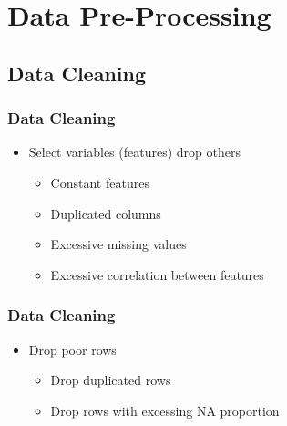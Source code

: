 



\begin{frame}
   \titlepage
\end{frame}



\begin{frame}
   \tableofcontents
\end{frame}



\section{Data Pre-Processing}


\subsection{Data Cleaning}


\begin{frame}\frametitle{Data Cleaning}
   \begin{itemize}
      \item Select variables (features) drop others
      \begin{itemize}
         \item Constant features
         \item Duplicated columns
         \item Excessive missing values
         \item Excessive correlation between features
      \end{itemize}
   \end{itemize}
\end{frame}

\begin{frame}\frametitle{Data Cleaning}
   \begin{itemize}
      \item Drop poor rows
      \begin{itemize}
         \item Drop duplicated rows
         \item Drop rows with excessing NA proportion
      \end{itemize}
   \end{itemize}
\end{frame}


